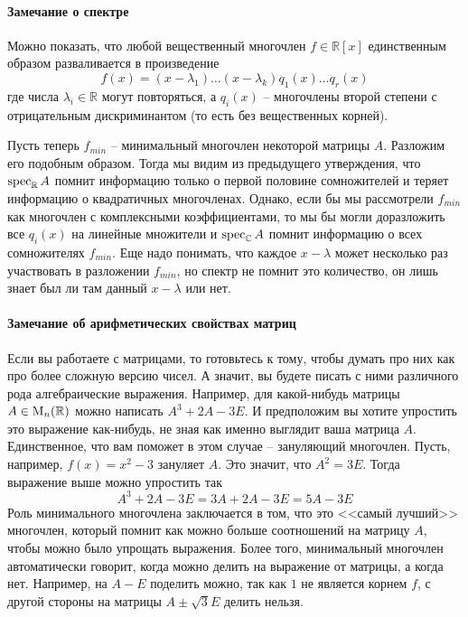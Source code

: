 \paragraph{Замечание о спектре}

Можно показать, что любой вещественный многочлен $f\in\mathbb R[x]$ единственным образом разваливается в произведение 
\[
f(x) = (x-\lambda_1)\ldots (x-\lambda_k) q_1(x)\ldots q_r(x)
\]
где числа $\lambda_i\in\mathbb R$ могут повторяться, а $q_i(x)$ -- многочлены второй степени с отрицательным дискриминантом (то есть без вещественных корней).

Пусть теперь $f_{min}$ -- минимальный многочлен некоторой матрицы $A$.
Разложим его подобным образом.
Тогда мы видим из предыдущего утверждения, что $\operatorname{spec}_\mathbb RA$ помнит информацию только о первой половине сомножителей и теряет информацию о квадратичных многочленах.
Однако, если бы мы рассмотрели $f_{min}$ как многочлен с комплексными коэффициентами, то мы бы могли доразложить все $q_i(x)$ на линейные множители и $\operatorname{spec}_\mathbb CA$ помнит информацию о всех сомножителях $f_{min}$.
Еще надо понимать, что каждое $x-\lambda$ может несколько раз участвовать в разложении $f_{min}$, но спектр не помнит это количество, он лишь знает был ли там данный $x-\lambda$ или нет.

\paragraph{Замечание об арифметических свойствах матриц}

Если вы работаете с матрицами, то готовьтесь к тому, чтобы думать про них как про более сложную версию чисел.
А значит, вы будете писать с ними различного рода алгебраические выражения.
Например, для какой-нибудь матрицы $A\in\operatorname{M}_{n}(\mathbb R)$ можно написать $A^3 + 2 A - 3E$.
И предположим вы хотите упростить это выражение как-нибудь, не зная как именно выглядит ваша матрица $A$.
Единственное, что вам поможет в этом случае -- зануляющий многочлен.
Пусть, например, $f(x) = x^2 - 3$ зануляет $A$.
Это значит, что $A^2 = 3 E$.
Тогда выражение выше можно упростить так
\[
A^3 + 2 A - 3 E = 3A + 2 A - 3 E = 5A - 3 E
\]
Роль минимального многочлена заключается в том, что это <<самый лучший>> многочлен, который помнит как можно больше соотношений на матрицу $A$, чтобы можно было упрощать выражения.
Более того, минимальный многочлен автоматически говорит, когда можно делить на выражение от матрицы, а когда нет.
Например, на $A - E$ поделить можно, так как $1$ не является корнем $f$, с другой стороны на матрицы $A \pm\sqrt{3}E$ делить нельзя.

